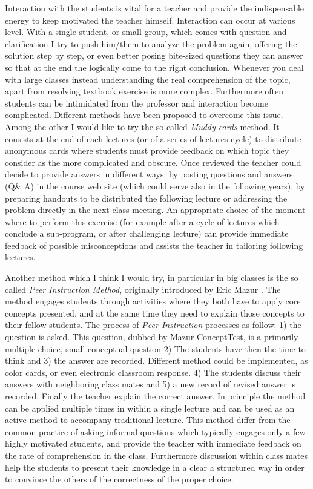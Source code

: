\documentclass[12pt,a4paper]{article}
\begin{document}
Interaction with the students is vital for a teacher and provide the
indispensable energy to keep motivated the teacher
himself. Interaction can occur at various level. 
With a
single student, or small group,  which comes with question and
clarification I try to push him/them to analyze the problem again, offering
the solution step by step, or even better posing bite-sized questions
they can answer so that at the end the logically come to the right
conclusion. Whenever you deal with large classes instead understanding
the real comprehension of the topic, apart from resolving textbook
exercise is more complex. Furthermore often students can be
intimidated from the professor and interaction become
complicated. Different methods have been proposed to overcome this
issue. Among the other I would like to try the so-called \emph{Muddy
  cards} method. It consists at the end of each lectures (or of a
series of lectures cycle) to distribute anonymous cards where students
must provide feedback on which topic they consider as the more
complicated and obscure. Once reviewed the
teacher could decide to provide answers in different ways: by posting
questions and answers (Q\& A) in the course web site (which could
serve also in the following years), by preparing handouts to be
distributed the following lecture or addressing the problem directly
in the next class meeting. An
appropriate choice of the moment where to perform this exercise (for
example after a cycle of lectures which conclude a sub-program, or
after challenging lecture) can provide immediate feedback of possible
misconceptions and assists the teacher in tailoring following lectures. 

Another method which I think I would try, in particular in big
classes is the so called \emph{Peer Instruction Method},  originally
introduced by Eric Mazur \cite{mazur2013peer}. The method engages
students through activities where they both have to apply core concepts
presented, and at the same time they need to explain those concepts to
their fellow students. The process of \emph{Peer Instruction} processes
as follow: 1) the question is asked. This question, dubbed by Mazur 
ConceptTest, is a primarily multiple-choice, small conceptual question
2) The students have then the time to think and 3) the answer are
recorded. Different method could be implemented, as color cards, or
even electronic classroom response. 4) The students discuss their
answers with neighboring class mates and 5) a new record of revised
answer is recorded. Finally the teacher explain the correct answer. In
principle the method can be applied multiple times in within a single
lecture and can be used as an active method to accompany traditional
lecture. This method differ from the common practice of asking
informal questions which typically engages only  a few highly
motivated students, and provide the teacher with immediate feedback on
the rate of comprehension in the class. Furthermore discussion within
class mates help the students to present their knowledge
in a clear a structured way in order to convince the others of the
correctness of the proper choice. 
\end{document}
